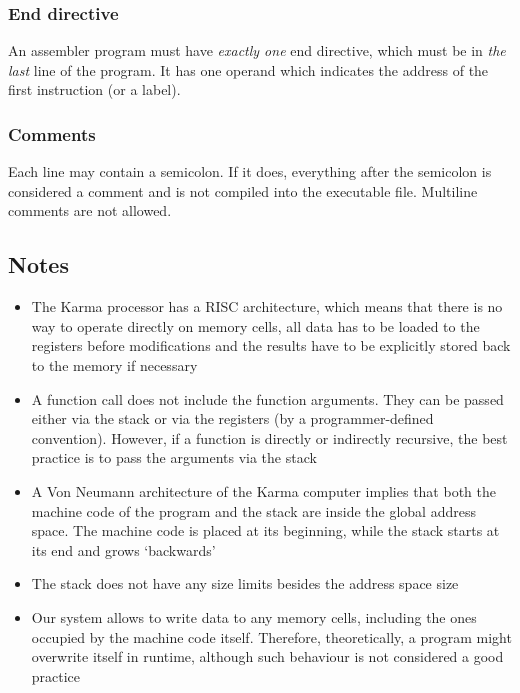 \documentclass{article}
\newcommand{\St}[1]{{\fontfamily{qcr}\selectfont #1}}
\begin{document}
\subsubsection{\St{End} directive}

An assembler program must have \textit{exactly one} \St{end} directive, which must be in \textit{the last} line of the program. It has one operand which indicates the address of the first instruction (or a label).

\subsubsection{Comments}

Each line may contain a semicolon. If it does, everything after the semicolon is considered a comment and is not compiled into the executable file. Multiline comments are not allowed.

\vspace{.4in}

\subsection{Notes}

\begin{itemize}
    \item The \St{Karma} processor has a RISC architecture, which means that there is no way to operate directly on memory cells, all data has to be loaded to the registers before modifications and the results have to be explicitly stored back to the memory if necessary
    \item A function call does not include the function arguments. They can be passed either via the stack or via the registers (by a programmer-defined convention). However, if a function is directly or indirectly recursive, the best practice is to pass the arguments via the stack
    \item A Von Neumann architecture of the \St{Karma} computer implies that both the machine code of the program and the stack are inside the global address space. The machine code is placed at its beginning, while the stack starts at its end and grows \lq backwards\rq
    \item The stack does not have any size limits besides the address space size
    \item Our system allows to write data to any memory cells, including the ones occupied by the machine  code itself. Therefore, theoretically, a program might overwrite itself in runtime, although such behaviour is not considered a good practice
\end{itemize}
\end{document}
